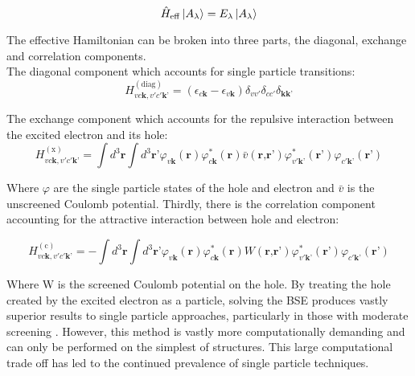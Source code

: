 \begin{equation}
\hat{H}_{\mathrm{eff}} \ket{A_\lambda} = E_\lambda \ket{A_\lambda}
\end{equation}


The effective Hamiltonian can be broken into three parts, the diagonal, exchange and correlation components\cite{draxl_bse_2009}. \\
The diagonal component which accounts for single particle transitions:
\begin{equation}
	H_{v c \textbf{k}, v' c'\textbf{k'}}^{(\mathrm{diag})} = (\epsilon_{c\textbf{k}}-\epsilon_{v \textbf{k}})\delta_{vv'}\delta_{cc'}\delta_{\textbf{kk'}}
\end{equation}

The exchange component which accounts for the repulsive interaction between the excited electron and its hole: 
\begin{equation}
	H_{v c \textbf{k}, v' c'\textbf{k'}}^{(\mathrm{x})} = \int d^3\textbf{r}\int d^3\textbf{r'}\varphi_{v\textbf{k}}(\textbf{r})\varphi_{c\textbf{k}}^*(\textbf{r})\bar{v}(\textbf{r,r'})\varphi_{v'\textbf{k'}}^*(\textbf{r'})\varphi_{c'\textbf{k'}}(\textbf{r'})
\end{equation}

Where $\varphi$ are the single particle states of the hole and electron and $\bar{v}$ is the unscreened Coulomb potential.  Thirdly, there is the correlation component accounting for the attractive interaction between hole and electron:

\begin{equation}
	H_{v c \textbf{k}, v' c'\textbf{k'}}^{(\mathrm{c})} = -\int d^3\textbf{r}\int d^3\textbf{r'}\varphi_{v\textbf{k}}(\textbf{r})\varphi_{c\textbf{k}}^*(\textbf{r})W(\textbf{r,r'})\varphi_{v'\textbf{k'}}^*(\textbf{r'})\varphi_{c'\textbf{k'}}(\textbf{r'})
\end{equation}

Where W is the screened Coulomb potential on the hole. By treating the hole created by the excited electron as a particle, solving the BSE produces vastly superior results to single particle approaches, particularly in those with moderate screening \cite{draxl_bse_2009}.  However, this method is vastly more computationally demanding and can only be performed on the simplest of structures.   This large computational trade off has led to the continued prevalence of single particle techniques.


